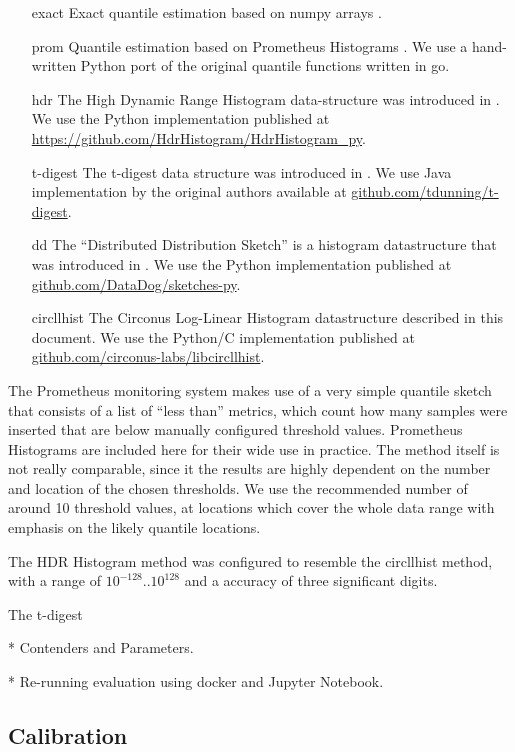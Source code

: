 \documentclass{article}
\theoremstyle{plain}
\theoremstyle{remark}
\begin{document}
\begin{itemize}
\item[exact]
  Exact quantile estimation based on numpy arrays \cite{numpy}.
\item[prom]
  Quantile estimation based on Prometheus Histograms \cite{prom}.
  We use a hand-written Python port of the original quantile functions written in go.
\item[hdr]
  The High Dynamic Range Histogram data-structure was introduced in \cite{hdr}.
  We use the Python implementation published at \url{https://github.com/HdrHistogram/HdrHistogram_py}.
\item[t-digest]
  The t-digest data structure was introduced in \cite{tdigest}.
  We use Java implementation by the original authors available at \url{github.com/tdunning/t-digest}.
\item[dd]
  The ``Distributed Distribution Sketch'' is a histogram datastructure that was introduced in \cite{dd}.
  We use the Python implementation published at \url{github.com/DataDog/sketches-py}.
\item[circllhist]
  The Circonus Log-Linear Histogram datastructure described in this document.
  We use the Python/C implementation published at \url{github.com/circonus-labs/libcircllhist}.
\end{itemize}

The Prometheus monitoring system makes use of a very simple quantile sketch that consists of a list
of ``less than'' metrics, which count how many samples were inserted that are below manually configured
threshold values.
Prometheus Histograms are included here for their wide use in practice.
The method itself is not really comparable, since it the results are highly dependent on the number
and location of the chosen thresholds.
We use the recommended number of around 10 threshold values, at locations which cover the whole
data range with emphasis on the likely quantile locations.

The HDR Histogram method was configured to resemble the circllhist method, with a range of
$10^{-128} .. 10^{128}$ and a accuracy of three significant digits.

The t-digest

* Contenders and Parameters.

* Re-running evaluation using docker and Jupyter Notebook.


\clearpage
\subsection{Calibration}
\end{document}
